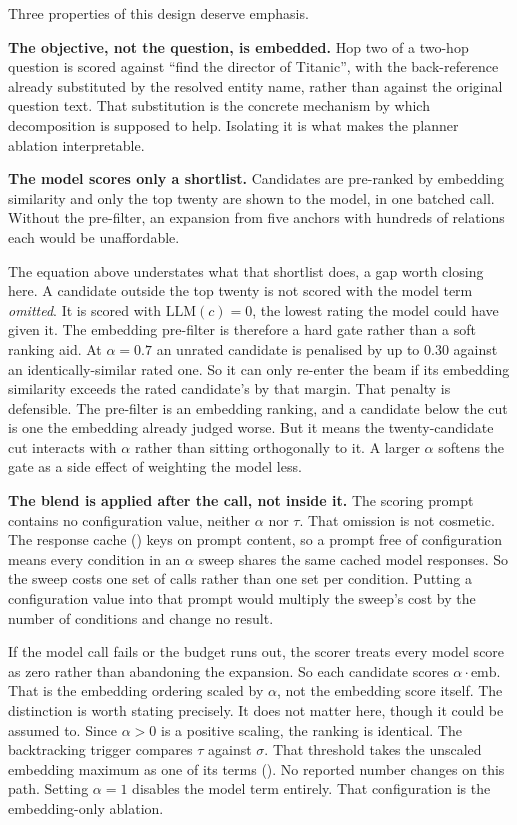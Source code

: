 Three properties of this design deserve emphasis.

\textbf{The objective, not the question, is embedded.} Hop two of a two-hop
question is scored against ``find the director of Titanic'', with the
back-reference already substituted by the resolved entity name, rather than
against the original question text. That substitution is the concrete mechanism
by which decomposition is supposed to help. Isolating it is what makes the
planner ablation interpretable.

\textbf{The model scores only a shortlist.} Candidates are pre-ranked by
embedding similarity and only the top twenty are shown to the model, in one
batched call. Without the pre-filter, an expansion from five anchors with
hundreds of relations each would be unaffordable.

The equation above understates what that shortlist does, a gap worth closing
here. A candidate outside the top twenty is not scored with the model term
\emph{omitted}. It is scored with $\mathrm{LLM}(c) = 0$, the lowest rating the
model could have given it. The embedding pre-filter is therefore a hard gate
rather than a soft ranking aid. At $\alpha = 0.7$ an unrated candidate is
penalised by up to $0.30$ against an identically-similar rated one. So it can
only re-enter the beam if its embedding similarity exceeds the rated candidate's
by that margin. That penalty is defensible. The pre-filter is an embedding
ranking, and a candidate below the cut is one the embedding already judged
worse. But it means the twenty-candidate cut interacts with $\alpha$ rather than
sitting orthogonally to it. A larger $\alpha$ softens the gate as a side effect
of weighting the model less.

\textbf{The blend is applied after the call, not inside it.} The scoring prompt
contains no configuration value, neither $\alpha$ nor $\tau$. That omission is
not cosmetic. The response cache () keys on prompt
content, so a prompt free of configuration means every condition in an $\alpha$
sweep shares the same cached model responses. So the sweep costs one set of
calls rather than one set per condition. Putting a configuration value into that
prompt would multiply the sweep's cost by the number of conditions and change no
result.

If the model call fails or the budget runs out, the scorer treats every model
score as zero rather than abandoning the expansion. So each candidate scores
$\alpha \cdot \mathrm{emb}$. That is the embedding ordering scaled by $\alpha$,
not the embedding score itself. The distinction is worth stating precisely. It
does not matter here, though it could be assumed to. Since $\alpha > 0$ is a
positive scaling, the ranking is identical. The backtracking trigger compares
$\tau$ against $\sigma$. That threshold takes the unscaled embedding maximum as
one of its terms (). No reported number changes on this
path. Setting $\alpha = 1$ disables the model term entirely. That configuration
is the embedding-only ablation.


